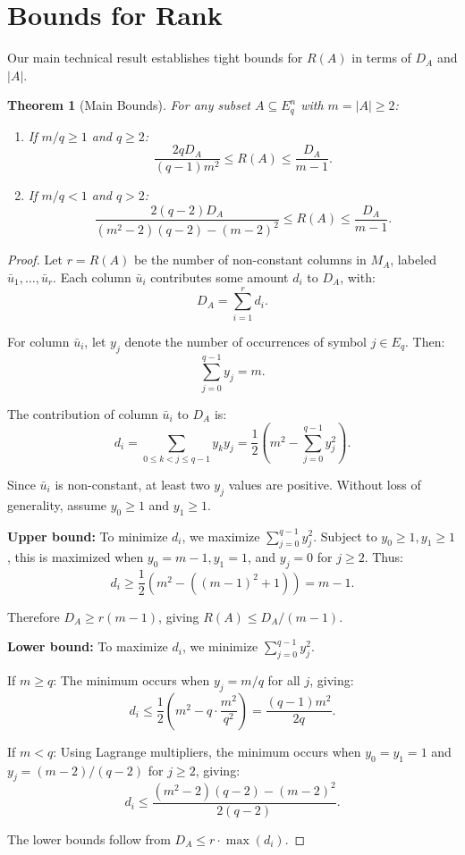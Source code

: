 \documentclass[12pt]{article}
\newtheorem{theorem}{Theorem}[section]
\newcommand{\Eq}{E_q}
\newcommand{\Eqn}{E_q^n}
\renewcommand{\geq}{\geqslant}
\renewcommand{\leq}{\leqslant}
\begin{document}
\section{Bounds for Rank}
\label{sec:bounds}

Our main technical result establishes tight bounds for $R(A)$ in terms of $D_A$ and $|A|$.

\begin{theorem}[Main Bounds]
\label{thm:main}
For any subset $A \subseteq \Eqn$ with $m = |A| \geq 2$:
\begin{enumerate}
\item If $m/q \geq 1$ and $q \geq 2$:
\[
\frac{2qD_A}{(q-1)m^2} \leq R(A) \leq \frac{D_A}{m-1}.
\]
\item If $m/q < 1$ and $q > 2$:
\[
\frac{2(q-2)D_A}{(m^2-2)(q-2)-(m-2)^2} \leq R(A) \leq \frac{D_A}{m-1}.
\]
\end{enumerate}
\end{theorem}

\begin{proof}
Let $r = R(A)$ be the number of non-constant columns in $M_A$, labeled $\bar{u}_1, \ldots, \bar{u}_r$. Each column $\bar{u}_i$ contributes some amount $d_i$ to $D_A$, with:
\[
D_A = \sum_{i=1}^r d_i.
\]

For column $\bar{u}_i$, let $y_j$ denote the number of occurrences of symbol $j \in \Eq$. Then:
\[
\sum_{j=0}^{q-1} y_j = m.
\]

The contribution of column $\bar{u}_i$ to $D_A$ is:
\[
d_i = \sum_{0 \leq k < j \leq q-1} y_k y_j = \frac{1}{2}\left(m^2 - \sum_{j=0}^{q-1} y_j^2\right).
\]

Since $\bar{u}_i$ is non-constant, at least two $y_j$ values are positive. Without loss of generality, assume $y_0 \geq 1$ and $y_1 \geq 1$.

\textbf{Upper bound:} To minimize $d_i$, we maximize $\sum_{j=0}^{q-1} y_j^2$. Subject to $y_0 \geq 1, y_1 \geq 1$, this is maximized when $y_0 = m-1, y_1 = 1$, and $y_j = 0$ for $j \geq 2$. Thus:
\[
d_i \geq \frac{1}{2}(m^2 - ((m-1)^2 + 1)) = m - 1.
\]

Therefore $D_A \geq r(m-1)$, giving $R(A) \leq D_A/(m-1)$.

\textbf{Lower bound:} To maximize $d_i$, we minimize $\sum_{j=0}^{q-1} y_j^2$.

If $m \geq q$: The minimum occurs when $y_j = m/q$ for all $j$, giving:
\[
d_i \leq \frac{1}{2}\left(m^2 - q \cdot \frac{m^2}{q^2}\right) = \frac{(q-1)m^2}{2q}.
\]

If $m < q$: Using Lagrange multipliers, the minimum occurs when $y_0 = y_1 = 1$ and $y_j = (m-2)/(q-2)$ for $j \geq 2$, giving:
\[
d_i \leq \frac{(m^2-2)(q-2)-(m-2)^2}{2(q-2)}.
\]

The lower bounds follow from $D_A \leq r \cdot \max(d_i)$.
\end{proof}
\end{document}
